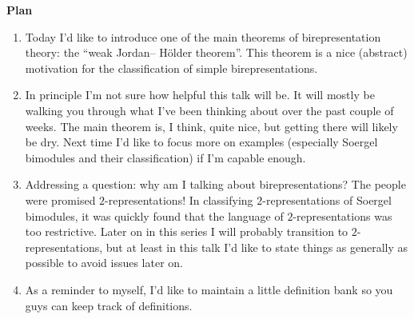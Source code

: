 \noindent\textbf{Plan}
\begin{enumerate}[label=$\bullet$, leftmargin=1\parindent]
\item Today I'd like to introduce one of the main theorems of birepresentation theory: the ``weak Jordan-- H\"{o}lder theorem''. This theorem is a nice (abstract) motivation for the classification of simple birepresentations.
\item In principle I'm not sure how helpful this talk will be. It will mostly be walking you through what I've been thinking about over the past couple of weeks. The main theorem is, I think, quite nice, but getting there will likely be dry. Next time I'd like to focus more on examples (especially Soergel bimodules and their classification) if I'm capable enough.
\item Addressing a question: why am I talking about birepresentations? The people were promised $2$-representations! In classifying $2$-representations of Soergel bimodules, it was quickly found that the language of $2$-representations was too restrictive. Later on in this series I will probably transition to $2$-representations, but at least in this talk I'd like to state things as generally as possible to avoid issues later on.
\item As a reminder to myself, I'd like to maintain a little definition bank so you guys can keep track of definitions.\\
\end{enumerate}

